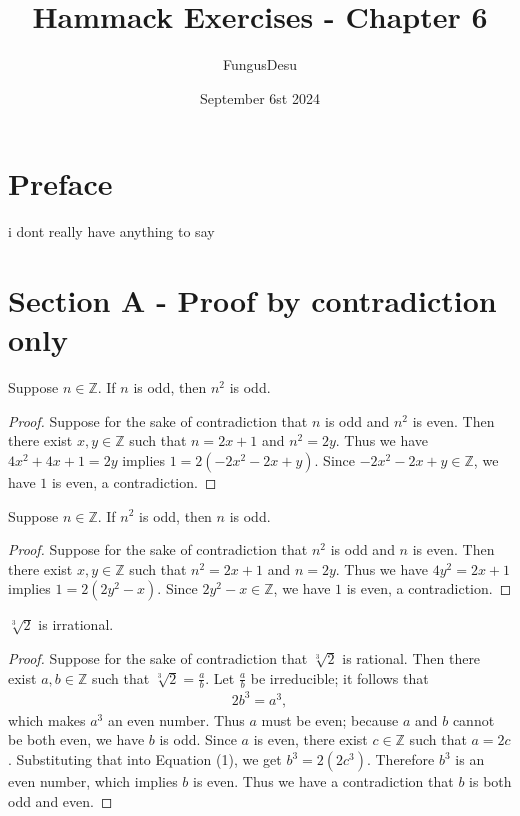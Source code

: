 \documentclass{exam}
\title{Hammack Exercises - Chapter 6}
\author{FungusDesu}
\date{September 6st 2024}
\begin{document}
\maketitle

\section{Preface}
i dont really have anything to say

\section{Section A - Proof by contradiction only}

\begin{proposition}{6.1}
    Suppose $n\in\mathbb Z$. If $n$ is odd, then $n^2$ is odd.
\end{proposition}

\begin{proof}
    Suppose for the sake of contradiction that $n$ is odd and $n^2$ is even. Then there exist $x,y\in\mathbb Z$ such that $n = 2x + 1$ and $n^2 = 2y$. Thus we have $4x^2+4x+1 = 2y$ implies $1 = 2(-2x^2 - 2x + y)$. Since $-2x^2 - 2x +y\in\mathbb Z$, we have $1$ is even, a contradiction.
\end{proof}

\begin{proposition}{6.2}
    Suppose $n\in\mathbb Z$. If $n^2$ is odd, then $n$ is odd.
\end{proposition}

\begin{proof}
    Suppose for the sake of contradiction that $n^2$ is odd and $n$ is even. Then there exist $x, y\in\mathbb Z$ such that $n^2 = 2x + 1$ and $n=2y$. Thus we have $4y^2 = 2x + 1$ implies $1 = 2(2y^2-x)$. Since $2y^2-x\in\mathbb Z$, we have $1$ is even, a contradiction.
\end{proof}

\begin{proposition}{6.3}
    $\sqrt[3]{2}$ is irrational.
\end{proposition}

\begin{proof}
    Suppose for the sake of contradiction that $\sqrt[3]{2}$ is rational. Then there exist $a,b\in\mathbb Z$ such that $\sqrt[3]{2} = \frac a b$. Let $\frac a b$ be irreducible; it follows that
    \begin{align}
        2b^3 = a^3,
    \end{align}
    which makes $a^3$ an even number. Thus $a$ must be even; because $a$ and $b$ cannot be both even, we have $b$ is odd. Since $a$ is even, there exist $c\in\mathbb Z$ such that $a = 2c$. Substituting that into Equation (1), we get $b^3 = 2(2c^3)$. Therefore $b^3$ is an even number, which implies $b$ is even. Thus we have a contradiction that $b$ is both odd and even.
\end{proof}
\end{document}
